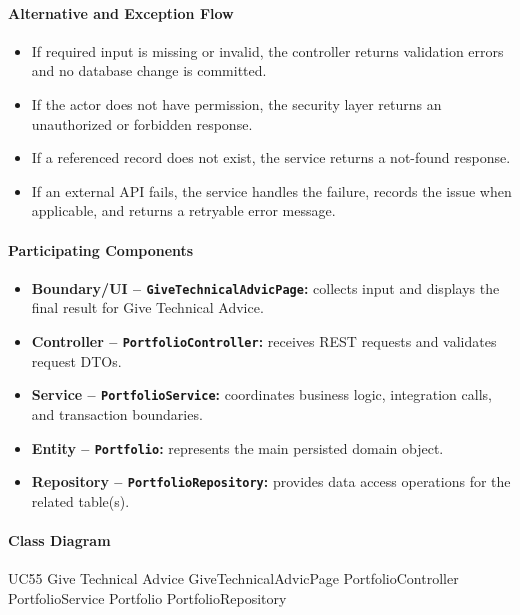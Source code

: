 \paragraph{Alternative and Exception Flow}

\begin{itemize}
    \item If required input is missing or invalid, the controller returns validation errors and no database change is committed.
    \item If the actor does not have permission, the security layer returns an unauthorized or forbidden response.
    \item If a referenced record does not exist, the service returns a not-found response.
    \item If an external API fails, the service handles the failure, records the issue when applicable, and returns a retryable error message.
\end{itemize}

\paragraph{Participating Components}

\begin{itemize}
    \item \textbf{Boundary/UI -- \texttt{GiveTechnicalAdvicPage}:} collects input and displays the final result for Give Technical Advice.
    \item \textbf{Controller -- \texttt{PortfolioController}:} receives REST requests and validates request DTOs.
    \item \textbf{Service -- \texttt{PortfolioService}:} coordinates business logic, integration calls, and transaction boundaries.
    \item \textbf{Entity -- \texttt{Portfolio}:} represents the main persisted domain object.
    \item \textbf{Repository -- \texttt{PortfolioRepository}:} provides data access operations for the related table(s).
\end{itemize}

\paragraph{Class Diagram}

\ClassDiagram
{UC55 Give Technical Advice}
{GiveTechnicalAdvicPage}
{PortfolioController}
{PortfolioService}
{Portfolio}
{PortfolioRepository}

